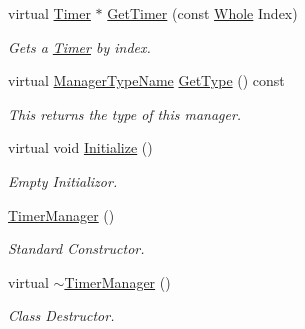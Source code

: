 \begin{DoxyCompactItemize}
virtual \hyperlink{classMezzanine_1_1Timer}{Timer} $\ast$ \hyperlink{classMezzanine_1_1TimerManager_a8e546d703c06c261771ce1cc3ac40779}{GetTimer} (const \hyperlink{namespaceMezzanine_adcbb6ce6d1eb4379d109e51171e2e493}{Whole} Index)
\begin{DoxyCompactList}\small\item\em Gets a \hyperlink{classMezzanine_1_1Timer}{Timer} by index. \item\end{DoxyCompactList}\item 
virtual \hyperlink{classMezzanine_1_1ManagerBase_a08cecf5169cad3e82be81a3a159b0b6e}{ManagerTypeName} \hyperlink{classMezzanine_1_1TimerManager_ad62b8c89fa33085768284781aa28116a}{GetType} () const 
\begin{DoxyCompactList}\small\item\em This returns the type of this manager. \item\end{DoxyCompactList}\item 
virtual void \hyperlink{classMezzanine_1_1TimerManager_ac670fd396b7fb2b7f8d7c67bb95582ba}{Initialize} ()
\begin{DoxyCompactList}\small\item\em Empty Initializor. \item\end{DoxyCompactList}\item 
\hypertarget{classMezzanine_1_1TimerManager_a14fa291d74cf22e5c7f0d0bd2d7ebdf3}{
\hyperlink{classMezzanine_1_1TimerManager_a14fa291d74cf22e5c7f0d0bd2d7ebdf3}{TimerManager} ()}
\label{classMezzanine_1_1TimerManager_a14fa291d74cf22e5c7f0d0bd2d7ebdf3}

\begin{DoxyCompactList}\small\item\em Standard Constructor. \item\end{DoxyCompactList}\item 
\hypertarget{classMezzanine_1_1TimerManager_a54a485339c796245ca01bb7a58829cb7}{
virtual \hyperlink{classMezzanine_1_1TimerManager_a54a485339c796245ca01bb7a58829cb7}{$\sim$TimerManager} ()}
\label{classMezzanine_1_1TimerManager_a54a485339c796245ca01bb7a58829cb7}

\begin{DoxyCompactList}\small\item\em Class Destructor. \item\end{DoxyCompactList}\end{DoxyCompactItemize}
